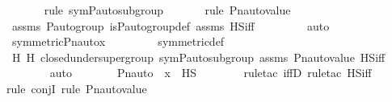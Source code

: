 \begin{isabellebody}
\ \ \ \ \ \ \isamarkupfalse%
{\isacharparenleft}{\kern0pt}rule\ sym{\isacharunderscore}{\kern0pt}P{\isacharunderscore}{\kern0pt}auto{\isacharunderscore}{\kern0pt}subgroup{\isacharparenright}{\kern0pt}\isanewline
\ \ \ \ \ \ \isamarkupfalse%
{\isacharparenleft}{\kern0pt}rule\ Pn{\isacharunderscore}{\kern0pt}auto{\isacharunderscore}{\kern0pt}value{\isacharparenright}{\kern0pt}\isanewline
\ \ \ \ \ \ \isamarkupfalse%
\ assms\ {\isasymG}{\isacharunderscore}{\kern0pt}P{\isacharunderscore}{\kern0pt}auto{\isacharunderscore}{\kern0pt}group\ is{\isacharunderscore}{\kern0pt}P{\isacharunderscore}{\kern0pt}auto{\isacharunderscore}{\kern0pt}group{\isacharunderscore}{\kern0pt}def\ assms{}\ HS{\isacharunderscore}{\kern0pt}iff\ \isanewline
\ \ \ \ \ \ \isamarkupfalse%
\ auto\isanewline
\isanewline
\ \ \ \ \isamarkupfalse%
\ \isamarkupfalse%
\ {\isachardoublequoteopen}symmetric{\isacharparenleft}{\kern0pt}Pn{\isacharunderscore}{\kern0pt}auto{\isacharparenleft}{\kern0pt}{\isasympi}{\isacharparenright}{\kern0pt}{\isacharbackquote}{\kern0pt}x{\isacharparenright}{\kern0pt}{\isachardoublequoteclose}\ \isanewline
\ \ \ \ \ \ \isamarkupfalse%
\ symmetric{\isacharunderscore}{\kern0pt}def\ \isanewline
\ \ \ \ \ \ \isamarkupfalse%
\ H{}\ H{}\ {\isasymF}{\isacharunderscore}{\kern0pt}closed{\isacharunderscore}{\kern0pt}under{\isacharunderscore}{\kern0pt}supergroup\ sym{\isacharunderscore}{\kern0pt}P{\isacharunderscore}{\kern0pt}auto{\isacharunderscore}{\kern0pt}subgroup\ assms{}\ Pn{\isacharunderscore}{\kern0pt}auto{\isacharunderscore}{\kern0pt}value\ HS{\isacharunderscore}{\kern0pt}iff\ \isanewline
\ \ \ \ \ \ \isamarkupfalse%
\ auto\isanewline
\isanewline
\ \ \ \ \isamarkupfalse%
\ \isamarkupfalse%
\ {\isachardoublequoteopen}Pn{\isacharunderscore}{\kern0pt}auto{\isacharparenleft}{\kern0pt}{\isasympi}{\isacharparenright}{\kern0pt}\ {\isacharbackquote}{\kern0pt}\ x\ {\isasymin}\ HS{\isachardoublequoteclose}\ \isanewline
\ \ \ \ \ \ \isamarkupfalse%
{\isacharparenleft}{\kern0pt}rule{\isacharunderscore}{\kern0pt}tac\ iffD{}{\isacharcomma}{\kern0pt}\ rule{\isacharunderscore}{\kern0pt}tac\ HS{\isacharunderscore}{\kern0pt}iff{\isacharparenright}{\kern0pt}\isanewline
\ \ \ \ \ \ \isamarkupfalse%
{\isacharparenleft}{\kern0pt}rule\ conjI{\isacharcomma}{\kern0pt}\ rule\ Pn{\isacharunderscore}{\kern0pt}auto{\isacharunderscore}{\kern0pt}value{\isacharparenright}{\kern0pt}\isanewline

\end{isabellebody}
